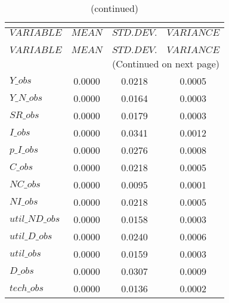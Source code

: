  
\begin{center}
\begin{longtable}{lccc} 
\caption{THEORETICAL MOMENTS}\\
 \label{Table:th_moments}\\
\toprule 
$VARIABLE       $	 & 	 $         MEAN$	 & 	 $    STD. DEV.$	 & 	 $     VARIANCE$\\
\midrule \endfirsthead 
\caption{(continued)}\\
 \toprule \\ 
$VARIABLE       $	 & 	 $         MEAN$	 & 	 $    STD. DEV.$	 & 	 $     VARIANCE$\\
\midrule \endhead 
\midrule \multicolumn{4}{r}{(Continued on next page)} \\ \bottomrule \endfoot 
\bottomrule \endlastfoot 
$Y\_obs         $	 & 	       0.0000	 & 	       0.0218	 & 	       0.0005 \\ 
$Y\_N\_obs      $	 & 	       0.0000	 & 	       0.0164	 & 	       0.0003 \\ 
$SR\_obs        $	 & 	       0.0000	 & 	       0.0179	 & 	       0.0003 \\ 
$I\_obs         $	 & 	       0.0000	 & 	       0.0341	 & 	       0.0012 \\ 
$p\_I\_obs      $	 & 	       0.0000	 & 	       0.0276	 & 	       0.0008 \\ 
$C\_obs         $	 & 	       0.0000	 & 	       0.0218	 & 	       0.0005 \\ 
$NC\_obs        $	 & 	       0.0000	 & 	       0.0095	 & 	       0.0001 \\ 
$NI\_obs        $	 & 	       0.0000	 & 	       0.0218	 & 	       0.0005 \\ 
$util\_ND\_obs  $	 & 	       0.0000	 & 	       0.0158	 & 	       0.0003 \\ 
$util\_D\_obs   $	 & 	       0.0000	 & 	       0.0240	 & 	       0.0006 \\ 
$util\_obs      $	 & 	       0.0000	 & 	       0.0159	 & 	       0.0003 \\ 
$D\_obs         $	 & 	       0.0000	 & 	       0.0307	 & 	       0.0009 \\ 
$tech\_obs      $	 & 	       0.0000	 & 	       0.0136	 & 	       0.0002 \\ 
\end{longtable}
 \end{center}
